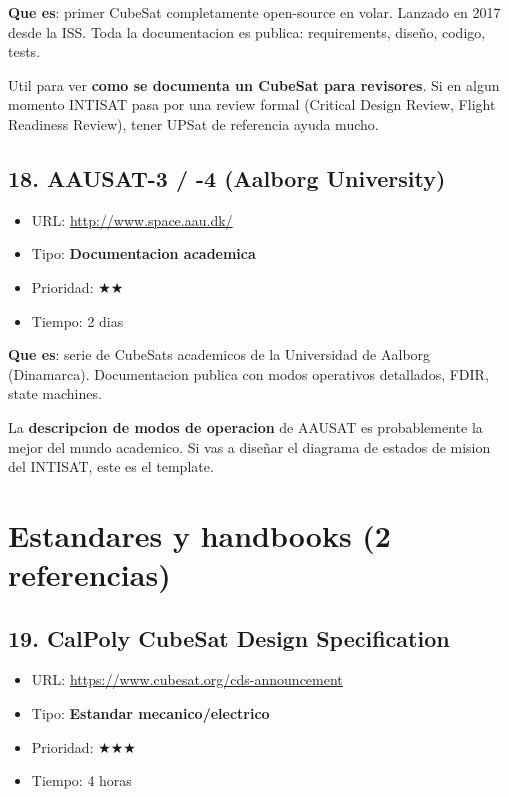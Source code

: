 \documentclass[11pt,a4paper,oneside]{report}
\begin{document}
\textbf{Que es}: primer CubeSat completamente open-source en volar. Lanzado
en 2017 desde la ISS. Toda la documentacion es publica: requirements,
diseño, codigo, tests.

\begin{nota}
Util para ver \textbf{como se documenta un CubeSat para revisores}. Si en
algun momento INTISAT pasa por una review formal (Critical Design Review,
Flight Readiness Review), tener UPSat de referencia ayuda mucho.
\end{nota}

\section{18. AAUSAT-3 / -4 (Aalborg University)}

\begin{itemize}[leftmargin=1.5em]
  \item URL: \url{http://www.space.aau.dk/}
  \item Tipo: \textbf{Documentacion academica}
  \item Prioridad: $\bigstar\bigstar$
  \item Tiempo: 2 dias
\end{itemize}

\textbf{Que es}: serie de CubeSats academicos de la Universidad de Aalborg
(Dinamarca). Documentacion publica con modos operativos detallados, FDIR,
state machines.

\begin{nota}
La \textbf{descripcion de modos de operacion} de AAUSAT es probablemente
la mejor del mundo academico. Si vas a diseñar el diagrama de estados
de mision del INTISAT, este es el template.
\end{nota}

\chapter{Estandares y handbooks (2 referencias)}

\section{19. CalPoly CubeSat Design Specification}

\begin{itemize}[leftmargin=1.5em]
  \item URL: \url{https://www.cubesat.org/cds-announcement}
  \item Tipo: \textbf{Estandar mecanico/electrico}
  \item Prioridad: $\bigstar\bigstar\bigstar$
  \item Tiempo: 4 horas
\end{itemize}
\end{document}
